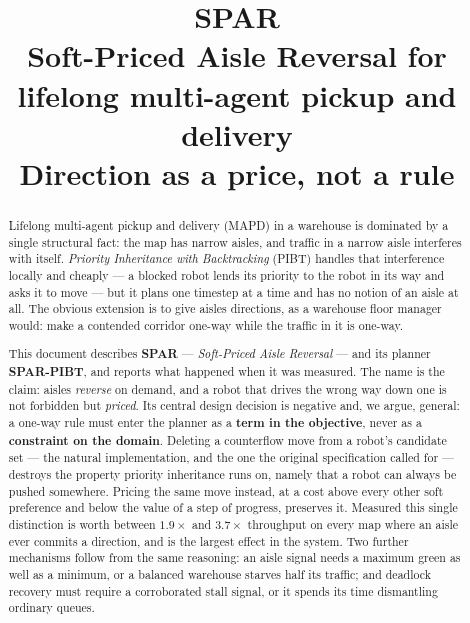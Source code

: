 \documentclass[11pt,a4paper]{article}
\title{\textbf{SPAR}\\[0.2em]
  \large \textnormal{\textbf{S}oft-\textbf{P}riced \textbf{A}isle
  \textbf{R}eversal for lifelong multi-agent pickup and delivery}\\[0.55em]
  \large Direction as a price, not a rule}
\author{}
\date{}
\begin{document}
\maketitle
\thispagestyle{empty}

\begin{abstract}
\noindent
Lifelong multi-agent pickup and delivery (MAPD) in a warehouse is dominated by
a single structural fact: the map has narrow aisles, and traffic in a narrow
aisle interferes with itself. \emph{Priority Inheritance with Backtracking}
(PIBT) handles that interference locally and cheaply --- a blocked robot lends
its priority to the robot in its way and asks it to move --- but it plans one
timestep at a time and has no notion of an aisle at all. The obvious extension
is to give aisles directions, as a warehouse floor manager would: make a
contended corridor one-way while the traffic in it is one-way.

This document describes \textbf{SPAR} --- \emph{Soft-Priced Aisle
Reversal} --- and its planner \textbf{SPAR-PIBT}, and
reports what happened when it was measured. The name is the claim: aisles
\emph{reverse} on demand, and a robot that drives the wrong way down one is
not forbidden but \emph{priced}. Its central design decision is negative and, we
argue, general: a one-way rule must enter the planner as a \textbf{term in the
objective}, never as a \textbf{constraint on the domain}. Deleting a
counterflow move from a robot's candidate set --- the natural implementation,
and the one the original specification called for --- destroys the property
priority inheritance runs on, namely that a robot can always be pushed
somewhere. Pricing the same move instead, at a cost above every other soft
preference and below the value of a step of progress, preserves it. Measured
this single distinction is worth between $1.9\times$ and $3.7\times$
throughput on every map where an aisle ever commits a direction, and is the
largest effect in the system. Two further
mechanisms follow from the same reasoning: an aisle signal needs a maximum
green as well as a minimum, or a balanced warehouse starves half its traffic;
and deadlock recovery must require a corroborated stall signal, or it spends
its time dismantling ordinary queues.


\end{abstract}
\end{document}
